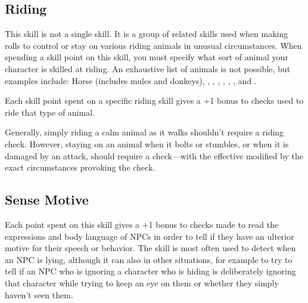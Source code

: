 \begin{multicols*}{2}

\subsection{Riding}\label{skill:Riding}
This skill is not a single skill. It is a group of related skills used when making rolls to control or stay on various riding animals in unusual circumstances. When spending a skill point on this skill, you must specify what sort of animal your character is skilled at riding. An exhaustive list of animals is not possible, but examples include: Horse (includes mules and donkeys), , , , , , , and  .

Each skill point spent on a specific riding skill gives a +1 bonus to  checks used to ride that type of animal.

Generally, simply riding a calm animal as it walks shouldn’t require a riding check. However, staying on an animal when it bolts or stumbles, or when it is damaged by an attack, should require a check—with the effective  modified by the exact circumstances provoking the check.

\subsection{Sense Motive}\label{skill:Sense Motive}
Each point spent on this skill gives a +1 bonus to  checks made to read the expressions and body language of NPCs in order to tell if they have an ulterior motive for their speech or behavior. The skill is most often used to detect when an NPC is lying, although it can also in other situations, for example to try to tell if an NPC who is ignoring a character who is hiding is deliberately ignoring that character while trying to keep an eye on them or whether they simply haven’t seen them.



\end{multicols*}
